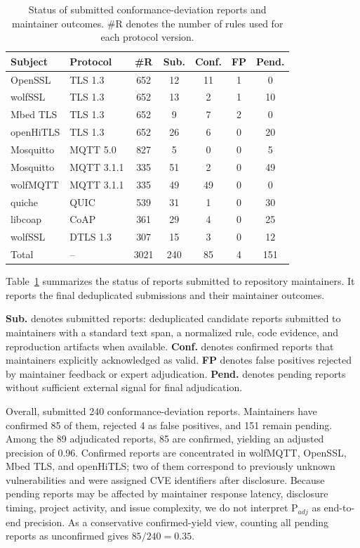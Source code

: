 \begin{table}[t]
\centering
\caption{Status of submitted conformance-deviation reports and maintainer outcomes.
\#R denotes the number of rules used for each protocol version. }
\label{tab:verification-results}
\normalsize
\setlength{\tabcolsep}{3pt}
\begin{tabular}{llccccc}
\toprule
\textbf{Subject}
& \textbf{Protocol}
& \textbf{\#R}
& \textbf{Sub.}
& \textbf{Conf.}
& \textbf{FP}
& \textbf{Pend.} \\
\midrule
OpenSSL    & TLS 1.3    & 652 & 12 & 11 & 1 & 0 \\
wolfSSL    & TLS 1.3    & 652 & 13 & 2  & 1 & 10 \\
Mbed TLS   & TLS 1.3    & 652 & 9  & 7  & 2 & 0 \\
openHiTLS  & TLS 1.3    & 652 & 26 & 6  & 0 & 20 \\
Mosquitto  & MQTT 5.0   & 827 & 5  & 0  & 0 & 5 \\
Mosquitto  & MQTT 3.1.1 & 335 & 51 & 2  & 0 & 49 \\
wolfMQTT   & MQTT 3.1.1 & 335 & 49 & 49 & 0 & 0 \\
quiche     & QUIC       & 539 & 31 & 1  & 0 & 30 \\
libcoap    & CoAP       & 361 & 29 & 4  & 0 & 25 \\
wolfSSL    & DTLS 1.3   & 307 & 15 & 3  & 0 & 12 \\
\midrule
Total      & --         & 3021 & 240 & 85 & 4 & 151 \\
\bottomrule
\end{tabular}
\end{table}

Table~\ref{tab:verification-results} summarizes the status of reports submitted
to repository maintainers. It reports the final deduplicated submissions and
their maintainer outcomes.

\textbf{Sub.} denotes submitted reports: deduplicated candidate reports
submitted to maintainers with a standard text span, a normalized rule, code
evidence, and reproduction artifacts when available. \textbf{Conf.} denotes
confirmed reports that maintainers explicitly acknowledged as valid.
\textbf{FP} denotes false positives rejected by maintainer feedback or
expert adjudication. \textbf{Pend.} denotes pending reports without sufficient
external signal for final adjudication.

Overall, \tool{} submitted 240 conformance-deviation reports. Maintainers have
confirmed 85 of them, rejected 4 as false positives, and 151 remain
pending. Among the 89 adjudicated reports, 85 are confirmed, yielding
an adjusted precision of 0.96. Confirmed reports are concentrated in wolfMQTT,
OpenSSL, Mbed TLS, and openHiTLS; two of them correspond to previously unknown
vulnerabilities and were assigned CVE identifiers after disclosure. Because
pending reports may be affected by maintainer response latency, disclosure
timing, project activity, and issue complexity, we do not interpret
$\mathrm{P}_{adj}$ as end-to-end precision. As a conservative confirmed-yield
view, counting all pending reports as unconfirmed gives $85/240=0.35$.

